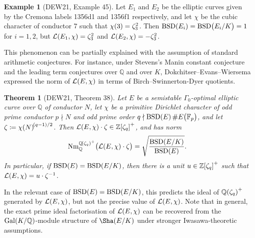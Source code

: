 \documentclass{article}
\theoremstyle{plain}
\newtheorem*{theorem}{Theorem}
\theoremstyle{definition}
\newtheorem*{example}{Example}
\newcommand{\BSD}{\mathrm{BSD}}
\newcommand{\FF}{\mathbb{F}}
\newcommand{\Gal}{\mathrm{Gal}}
\newcommand{\LLL}{\mathcal{L}}
\newcommand{\Nm}{\mathrm{Nm}}
\newcommand{\QQ}{\mathbb{Q}}
\newcommand{\ZZ}{\mathbb{Z}}
\newcommand{\br}{\!\del}
\begin{document}
\begin{example}[DEW21, Example 45]
Let $ E_1 $ and $ E_2 $ be the elliptic curves given by the Cremona labels 1356d1 and 1356f1 respectively, and let $ \chi $ be the cubic character of conductor $ 7 $ such that $ \chi\br{3} = \zeta_3^2 $. Then $ \BSD\br{E_i} = \BSD\br{E_i / K} = 1 $ for $ i = 1, 2 $, but $ \LLL\br{E_1, \chi} = \zeta_3^2 $ and $ \LLL\br{E_2, \chi} = -\zeta_3^2 $.
\end{example}

This phenomenon can be partially explained with the assumption of standard arithmetic conjectures. For instance, under Stevens's Manin constant conjecture and the leading term conjectures over $ \QQ $ and over $ K $, Dokchitser--Evans--Wiersema expressed the norm of $ \LLL\br{E, \chi} $ in terms of Birch--Swinnerton-Dyer quotients.

\begin{theorem}[DEW21, Theorem 38]
Let $ E $ be a semistable $ \Gamma_0 $-optimal elliptic curve over $ \QQ $ of conductor $ N $, let $ \chi $ be a primitive Dirichlet character of odd prime conductor $ p \nmid N $ and odd prime order $ q \nmid \BSD\br{E}\#E\br{\FF_p} $, and let $ \zeta \coloneqq \chi\br{N}^{\br{q - 1} / 2} $. Then $ \LLL\br{E, \chi} \cdot \zeta \in \ZZ\sbr[0]{\zeta_q}^+ $, and has norm
$$ \Nm_\QQ^{\QQ\br[0]{\zeta_q}^+}\br{\LLL\br{E, \chi} \cdot \zeta} = \sqrt{\dfrac{\BSD\br[0]{E / K}}{\BSD\br{E}}}. $$
In particular, if $ \BSD\br{E} = \BSD\br[0]{E / K} $, then there is a unit $ u \in \ZZ\sbr[0]{\zeta_q}^+ $ such that $ \LLL\br{E, \chi} = u \cdot \zeta^{-1} $.
\end{theorem}

In the relevant case of $ \BSD\br{E} = \BSD\br[0]{E / K} $, this predicts the ideal of $ \QQ\br[0]{\zeta_q}^+ $ generated by $ \LLL\br{E, \chi} $, but not the precise value of $ \LLL\br{E, \chi} $. Note that in general, the exact prime ideal factorisation of $ \LLL\br{E, \chi} $ can be recovered from the $ \Gal\br[0]{K / \QQ} $-module structure of $ \Sha\br[0]{E / K} $ under stronger Iwasawa-theoretic assumptions.
\end{document}
